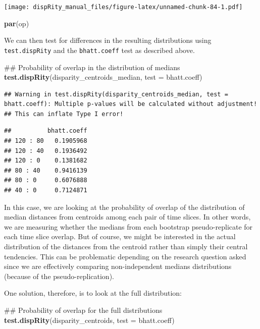 \documentclass[]{book}
\newenvironment{Shaded}{\begin{snugshade}}{\end{snugshade}}
\newcommand{\KeywordTok}[1]{\textcolor[rgb]{0.13,0.29,0.53}{\textbf{#1}}}
\newcommand{\DataTypeTok}[1]{\textcolor[rgb]{0.13,0.29,0.53}{#1}}
\newcommand{\NormalTok}[1]{#1}
\theoremstyle{definition}
\theoremstyle{definition}
\theoremstyle{definition}
\theoremstyle{remark}
\begin{document}
\texttt{[image: dispRity\_manual\_files/figure-latex/unnamed-chunk-84-1.pdf]}

\begin{Shaded}
\begin{Highlighting}[]
\KeywordTok{par}\NormalTok{(op)}
\end{Highlighting}
\end{Shaded}

We can then test for differences in the resulting distributions using
\texttt{test.dispRity} and the \texttt{bhatt.coeff} test as described
above.

\begin{Shaded}
\begin{Highlighting}[]
\NormalTok{## Probability of overlap in the distribution of medians}
\KeywordTok{test.dispRity}\NormalTok{(disparity_centroids_median, }\DataTypeTok{test =}\NormalTok{ bhatt.coeff)}
\end{Highlighting}
\end{Shaded}

\begin{verbatim}
## Warning in test.dispRity(disparity_centroids_median, test = bhatt.coeff): Multiple p-values will be calculated without adjustment!
## This can inflate Type I error!
\end{verbatim}

\begin{verbatim}
##          bhatt.coeff
## 120 : 80   0.1905968
## 120 : 40   0.1936492
## 120 : 0    0.1381682
## 80 : 40    0.9416139
## 80 : 0     0.6076888
## 40 : 0     0.7124871
\end{verbatim}

In this case, we are looking at the probability of overlap of the
distribution of median distances from centroids among each pair of time
slices. In other words, we are measuring whether the medians from each
bootstrap pseudo-replicate for each time slice overlap. But of course,
we might be interested in the actual distribution of the distances from
the centroid rather than simply their central tendencies. This can be
problematic depending on the research question asked since we are
effectively comparing non-independent medians distributions (because of
the pseudo-replication).

One solution, therefore, is to look at the full distribution:

\begin{Shaded}
\begin{Highlighting}[]
\NormalTok{## Probability of overlap for the full distributions}
\KeywordTok{test.dispRity}\NormalTok{(disparity_centroids, }\DataTypeTok{test =}\NormalTok{ bhatt.coeff)}
\end{Highlighting}
\end{Shaded}
\end{document}
